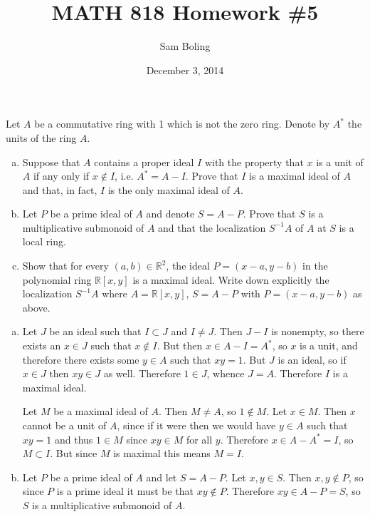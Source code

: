\documentclass{article}
\title{MATH 818 Homework \#5}
\date{December 3, 2014}
\author{Sam Boling}
\newcounter{Problem}
\newenvironment{Problem}{\begin{Exercise}[name={Problem},
                                          counter={Problem}]}
                        {\end{Exercise}}
\begin{document}
\begin{titlepage}
\maketitle
\end{titlepage}

\begin{Problem}
  Let $A$ be a commutative ring with 1 which is not the zero
  ring. Denote by $A^\ast$ the units of the ring $A$.
  \begin{enumerate}[(a)]
    \item{
      Suppose that $A$ contains a proper ideal $I$ with the property
      that $x$ is a unit of $A$ if any only if $x \notin I$, i.e.
      $A^\ast = A - I$. Prove that $I$ is a maximal ideal of $A$ and
      that, in fact, $I$ is the only maximal ideal of $A$.
    }
    \item{
      Let $P$ be a prime ideal of $A$ and denote $S = A - P$. Prove
      that $S$ is a multiplicative submonoid of $A$ and that the
      localization $S^{-1}A$ of $A$ at $S$ is a local ring.
    }
    \item{
      Show that for every $(a, b) \in \mathbb{R}^2$, the ideal
      $P = (x - a, y - b)$ in the polynomial ring
      $\mathbb{R}[x, y]$ is a maximal ideal. Write down explicitly the
      localization $S^{-1} A$ where $A = \mathbb{R}[x, y]$,
      $S = A - P$ with $P = (x - a, y - b)$ as above.
    }
  \end{enumerate}
\end{Problem}

\begin{Answer}
  \begin{enumerate}[(a)]
    \item{
      Let $J$ be an ideal such that $I \subset J$ and
      $I \neq J$. Then $J - I$ is nonempty, so there exists an
      $x \in J$ such that $x \notin I$. But then
      $x \in A - I = A^\ast$, so $x$ is a unit, and therefore there
      exists some $y \in A$ such that $xy = 1$. But $J$ is an ideal,
      so if $x \in J$ then $xy \in J$ as well. Therefore $1 \in J$,
      whence $J = A$. Therefore $I$ is a maximal ideal.

      Let $M$ be a maximal ideal of $A$. Then $M \neq A$, so
      $1 \notin M$. Let $x \in M$. Then $x$ cannot be a unit of $A$,
      since if it were then we would have $y \in A$ such that $xy = 1$
      and thus $1 \in M$ since $xy \in M$ for all $y$. Therefore
      $x \in A - A^\ast = I$, so $M \subset I$. But since $M$ is
      maximal this means $M = I$.
    }
    \item{
      Let $P$ be a prime ideal of $A$ and let $S = A - P$. Let
      $x, y \in S$. Then $x, y \notin P$, so since $P$ is a prime
      ideal it must be that $xy \notin P$. Therefore $xy \in A - P =
      S$, so $S$ is a multiplicative submonoid of $A$.


    }
  \end{enumerate}
\end{Answer}
\end{document}
